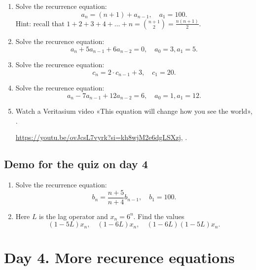 \documentclass[12pt]{article}
\begin{document}
\begin{enumerate}
    \item Solve the recurrence equation: 
    \[
    a_n = (n + 1) + a_{n-1}, \quad a_1 = 100.
    \]
    Hint: recall that $1 + 2 + 3 + 4 + \dots + n = {n+1 \choose 2} = \frac{n(n+1)}{2}$.
    \item Solve the recurence equation:
    \[
    a_n + 5 a_{n-1} + 6 a_{n-2} = 0, \quad a_0 = 3, a_1 = 5.
    \]
    \item Solve the recurence equation:
    \[
    c_n = 2 \cdot c_{n-1} + 3, \quad c_1 = 20.
    \]
    \item Solve the recurence equation:
    \[
    a_n - 7 a_{n-1} + 12 a_{n-2} = 6, \quad a_0 = 1, a_1 = 12.
    \]
     \item Watch a Veritasium video «This equation will change how you see the world», \cite{veritasium2025equation}.

    \url{https://youtu.be/ovJcsL7vyrk?si=kh8wjM2e6dgLSXzj}, .
\end{enumerate}


\subsection*{Demo for the quiz on day 4}

\begin{enumerate}
    \item Solve the recurrence equation:
    \[
    b_n = \frac{n + 5}{n + 4} b_{n-1}, \quad b_1 = 100.
    \]
    \item Here $L$ is the lag operator and $x_n = 6^n$. 
    Find the values
    \[
    (1 - 5L) x_n, \quad (1 - 6L)x_n, \quad (1-6L)(1 - 5L)x_n.
    \]
\end{enumerate}



\section{Day 4. More recurence equations}

\end{document}
